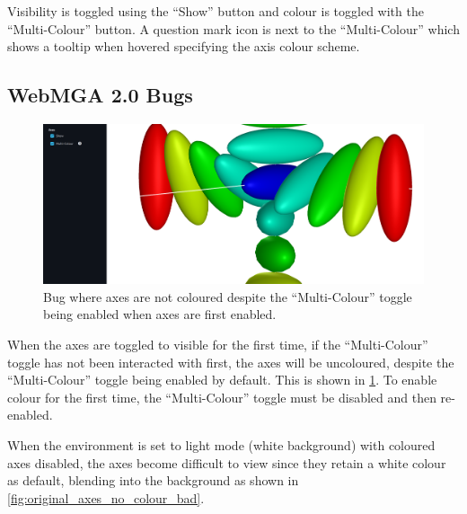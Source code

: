 Visibility is toggled using the ``Show'' button and colour is toggled with the ``Multi-Colour'' button. A question mark icon is next to the ``Multi-Colour'' which shows a tooltip when hovered specifying the axis colour scheme.

\subsection{WebMGA 2.0 Bugs}
\begin{figure}
  \begin{center}
    \includegraphics[width=\linewidth]{assets/images/axes/2_bug}
    \caption{\centering Bug where axes are not coloured despite the ``Multi-Colour'' toggle being enabled when axes are first enabled.}
    \label{fig:original_bug}
  \end{center}
\end{figure}

When the axes are toggled to visible for the first time, if the ``Multi-Colour'' toggle has not been interacted with first, the axes will be uncoloured, despite the ``Multi-Colour'' toggle being enabled by default. This is shown in \cref{fig:original_bug}. To enable colour for the first time, the ``Multi-Colour'' toggle must be disabled and then re-enabled.

When the environment is set to light mode (white background) with coloured axes disabled, the axes become difficult to view since they retain a white colour as default, blending into the background as shown in \cref{fig:original_axes_no_colour_bad}.

